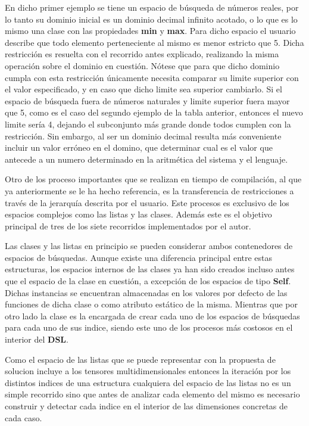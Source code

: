 En dicho primer ejemplo se tiene un espacio de búsqueda de números reales, por lo tanto su dominio inicial es un dominio decimal infinito acotado,
o lo que es lo mismo una clase con las propiedades {\bf min} y {\bf max}. Para dicho espacio el usuario describe que todo elemento perteneciente
al mismo es menor estricto que 5. Dicha restricción es resuelta con el recorrido antes explicado, realizando la misma operación sobre
el dominio en cuestión. Nótese que para que dicho dominio cumpla con esta restricción únicamente necesita comparar su limite superior
con el valor especificado, y en caso que dicho limite sea superior cambiarlo. Si el espacio de búsqueda fuera de números naturales y
limite superior fuera mayor que 5, como es el caso del segundo ejemplo de la tabla anterior, entonces el nuevo limite sería 4, dejando
el subconjunto más grande donde todos cumplen con la restricción. Sin embargo, al ser un dominio decimal resulta más conveniente
incluir un valor erróneo en el domino, que determinar cual es el valor que antecede a un numero determinado en la aritmética del
sistema y el lenguaje.

Otro de los proceso importantes que se realizan en tiempo de compilación, al que ya anteriormente se le ha hecho referencia,
es la transferencia de restricciones a través de la jerarquía descrita por el usuario. Este procesos es exclusivo de los espacios
complejos como las listas y las clases. Además este es el objetivo principal de tres de los siete recorridos implementados por el
autor.

Las clases y las listas en principio se pueden considerar ambos contenedores de espacios de búsquedas. Aunque existe una diferencia
principal entre estas estructuras, los espacios internos de las clases ya han sido creados incluso antes que el espacio de la clase
en cuestión, a excepción de los espacios de tipo {\bf Self}. Dichas instancias se encuentran almacenadas en los valores por defecto de
las funciones de dicha clase o como atributo estático de la misma. Mientras que por otro lado la clase  es la
encargada de crear cada uno de los espacios de búsquedas para cada uno de sus indice, siendo este uno de los procesos más costosos
en el interior del {\bf DSL}.

Como el espacio de las listas que se puede representar con la propuesta de solucion incluye a los tensores
multidimensionales entonces la iteración por los distintos indices de una estructura cualquiera del espacio de las listas no es un
simple recorrido sino que antes de analizar cada elemento del mismo es necesario construir y detectar cada indice en el interior
de las dimensiones concretas de cada caso.

